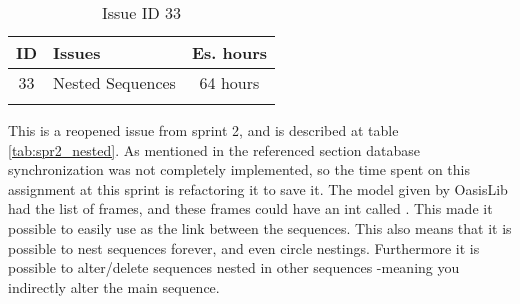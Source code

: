 \begin{longtable} { | c | p{12cm} | c | } 
\hline
	ID 	&	Issues	&		 Es. hours \\\hline
	33	&	Nested Sequences	&	64 hours	\\\hline
\caption{Issue ID 33}
\label{tab:spr4_nestedSequence}
\end{longtable}

This is a reopened issue from sprint 2, and is described at table \ref{tab:spr2_nested}. As mentioned in the referenced section database synchronization was not completely implemented, so the time spent on this assignment at this sprint is refactoring it to save it. The  model given by OasisLib had the list of frames, and these frames could have an int called . This made it possible to easily use  as the link between the sequences.
This also means that it is possible to nest sequences forever, and even circle nestings. Furthermore it is possible to alter/delete sequences nested in other sequences -meaning you indirectly alter the main sequence.